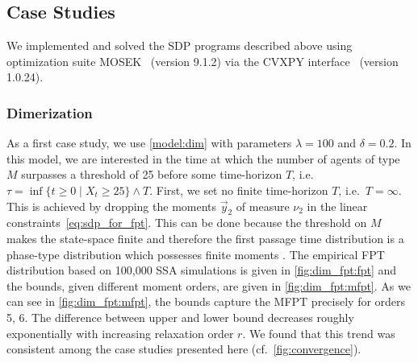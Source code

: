 \subsection{Case Studies}
We implemented and solved the SDP programs described above using optimization suite MOSEK~\cite{mosek} (version 9.1.2) via the CVXPY
interface~\cite{cvxpy} (version 1.0.24).

\subsubsection{Dimerization}
As a first case study, we use \autoref{model:dim} with parameters $\lambda=100$ and $\delta=0.2$.
In this model, we are interested in the time at which the number of agents of type $M$
surpasses a threshold of 25 before some time-horizon $T$,
i.e.\ $\tau=\inf\{t\geq 0\mid X_t \geq 25\}\land T$.
First, we set no finite time-horizon $T$, i.e.\ $T=\infty$.
This is achieved by dropping the moments $\vec y_2$
of measure $\nu_2$ in the linear constraints~\eqref{eq:sdp_for_fpt}.
This can be done because the threshold on $M$ makes the state-space finite
and therefore the first passage time distribution is a phase-type distribution
which possesses finite moments \cite[Chapter 7.6]{stewart2009probability}.
The empirical FPT distribution based on 100,000 SSA simulations is given in \autoref{fig:dim_fpt:fpt}
and the bounds, given different moment orders, are given in \autoref{fig:dim_fpt:mfpt}.
As we can see in \autoref{fig:dim_fpt:mfpt}, the bounds capture the MFPT precisely for orders 5, 6.
The difference between upper and lower bound decreases roughly exponentially with increasing relaxation order $r$.
We found that this trend was consistent among the case studies presented here (cf.\ \autoref{fig:convergence}).
